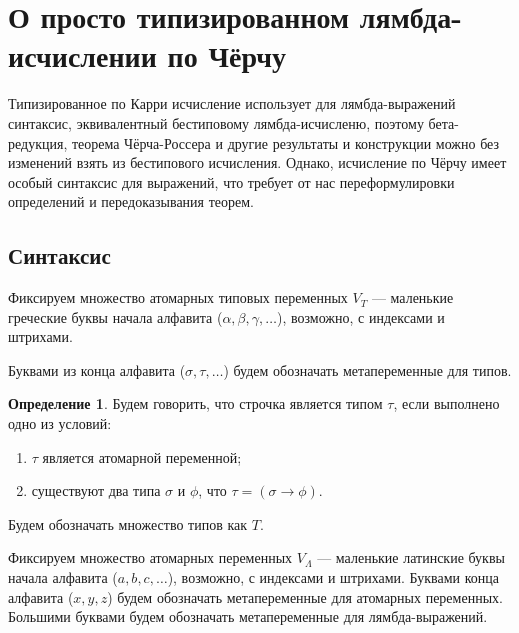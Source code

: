 \documentclass[10pt,a4paper,oneside]{article}
\begin{document}
\theoremstyle{definition}
\newtheorem{definition}{Определение}[section]
\newtheorem*{example}{Пример}
\newtheorem{theorem}{Теорема}[section]
\newtheorem{axiom}{Аксиома}[section]
\newtheorem{lemma}[theorem]{Лемма}

\section*{О просто типизированном лямбда-исчислении по Чёрчу}

Типизированное по Карри исчисление использует для лямбда-выражений синтаксис, эквивалентный 
бестиповому лямбда-исчисленю, поэтому бета-редукция, теорема Чёрча-Россера и другие результаты
и конструкции можно без изменений взять из бестипового исчисления. Однако, исчисление по
Чёрчу имеет особый синтаксис для выражений, что требует от нас переформулировки определений
и передоказывания теорем.

\subsection{Синтаксис}

Фиксируем множество атомарных типовых переменных $V_T$ --- маленькие греческие буквы начала 
алфавита ($\alpha, \beta, \gamma, \dots$), возможно, с индексами и штрихами. 

Буквами из конца алфавита ($\sigma, \tau, \dots$) будем обозначать метапеременные для типов.

\begin{definition}
Будем говорить, что строчка является типом $\tau$, если выполнено одно из условий:

\begin{enumerate}
\item $\tau$ является атомарной переменной;
\item существуют два типа $\sigma$ и $\phi$, что $\tau = (\sigma\rightarrow\phi)$.
\end{enumerate}

Будем обозначать множество типов как $T$.
\end{definition}

Фиксируем множество атомарных переменных $V_\Lambda$ --- маленькие латинские буквы начала 
алфавита ($a, b, c, \dots$), возможно, с индексами и штрихами.
Буквами конца алфавита ($x, y, z$) будем обозначать метапеременные для атомарных переменных.
Большими буквами будем обозначать метапеременные для лямбда-выражений.
\end{document}
